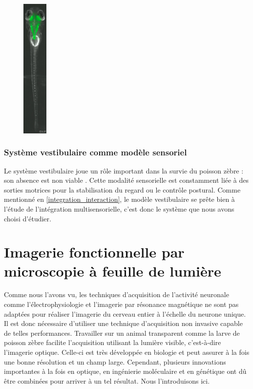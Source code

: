 ~\vspace{-3em}%
\begin{figure}%
  \vspace{-15em}
  \begin{flushright}%
    \includegraphics[width=0.11\textwidth]{./files/fishbrainmontage.jpg}%
  \end{flushright}%
\end{figure} %


\subsubsection{Système vestibulaire comme modèle sensoriel}

Le système vestibulaire joue un rôle important dans la survie du poisson zèbre : son absence est non viable \cite{riley_development_2000}. Cette modalité sensorielle est constamment liée à des sorties motrices pour la stabilisation du regard ou le contrôle postural. Comme mentionné en \ref{integration_interaction}, le modèle vestibulaire se prête bien à l'étude de l'intégration multisensorielle, c'est donc le système que nous avons choisi d'étudier.


\section[Imagerie fonctionnelle]{Imagerie fonctionnelle par microscopie à feuille de lumière}

Comme nous l'avons vu, les techniques d'acquisition de l'activité neuronale comme l'électrophysiologie et l'imagerie par résonance magnétique ne sont pas adaptées pour réaliser l'imagerie du cerveau entier à l'échelle du neurone unique. Il est donc nécessaire d'utiliser une technique d'acquisition non invasive capable de telles performances. Travailler sur un animal transparent comme la larve de poisson zèbre facilite l'acquisition utilisant la lumière visible, c'est-à-dire l'imagerie optique. Celle-ci est très développée en biologie et peut assurer à la fois une bonne résolution et un champ large. Cependant, plusieurs innovations importantes à la fois en optique, en ingénierie moléculaire et en génétique ont dû être combinées pour arriver à un tel résultat. Nous l'introduisons ici.

